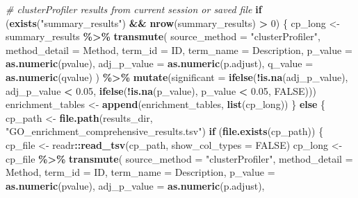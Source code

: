 \documentclass[
]{article}
\newenvironment{Shaded}{\begin{snugshade}}{\end{snugshade}}
\newcommand{\AttributeTok}[1]{\textcolor[rgb]{0.13,0.29,0.53}{#1}}
\newcommand{\CommentTok}[1]{\textcolor[rgb]{0.56,0.35,0.01}{\textit{#1}}}
\newcommand{\ConstantTok}[1]{\textcolor[rgb]{0.56,0.35,0.01}{#1}}
\newcommand{\ControlFlowTok}[1]{\textcolor[rgb]{0.13,0.29,0.53}{\textbf{#1}}}
\newcommand{\DecValTok}[1]{\textcolor[rgb]{0.00,0.00,0.81}{#1}}
\newcommand{\FloatTok}[1]{\textcolor[rgb]{0.00,0.00,0.81}{#1}}
\newcommand{\FunctionTok}[1]{\textcolor[rgb]{0.13,0.29,0.53}{\textbf{#1}}}
\newcommand{\NormalTok}[1]{#1}
\newcommand{\OtherTok}[1]{\textcolor[rgb]{0.56,0.35,0.01}{#1}}
\newcommand{\SpecialCharTok}[1]{\textcolor[rgb]{0.81,0.36,0.00}{\textbf{#1}}}
\newcommand{\StringTok}[1]{\textcolor[rgb]{0.31,0.60,0.02}{#1}}
\begin{document}
\begin{Shaded}
\begin{Highlighting}[]
\CommentTok{\# clusterProfiler results from current session or saved file}
\ControlFlowTok{if}\NormalTok{ (}\FunctionTok{exists}\NormalTok{(}\StringTok{"summary\_results"}\NormalTok{) }\SpecialCharTok{\&\&} \FunctionTok{nrow}\NormalTok{(summary\_results) }\SpecialCharTok{\textgreater{}} \DecValTok{0}\NormalTok{) \{}
\NormalTok{  cp\_long }\OtherTok{\textless{}{-}}\NormalTok{ summary\_results }\SpecialCharTok{\%\textgreater{}\%}
    \FunctionTok{transmute}\NormalTok{(}
      \AttributeTok{source\_method =} \StringTok{"clusterProfiler"}\NormalTok{,}
      \AttributeTok{method\_detail =}\NormalTok{ Method,}
      \AttributeTok{term\_id =}\NormalTok{ ID,}
      \AttributeTok{term\_name =}\NormalTok{ Description,}
      \AttributeTok{p\_value =} \FunctionTok{as.numeric}\NormalTok{(pvalue),}
      \AttributeTok{adj\_p\_value =} \FunctionTok{as.numeric}\NormalTok{(p.adjust),}
      \AttributeTok{q\_value =} \FunctionTok{as.numeric}\NormalTok{(qvalue)}
\NormalTok{    ) }\SpecialCharTok{\%\textgreater{}\%}
    \FunctionTok{mutate}\NormalTok{(}\AttributeTok{significant =} \FunctionTok{ifelse}\NormalTok{(}\SpecialCharTok{!}\FunctionTok{is.na}\NormalTok{(adj\_p\_value), adj\_p\_value }\SpecialCharTok{\textless{}} \FloatTok{0.05}\NormalTok{, }\FunctionTok{ifelse}\NormalTok{(}\SpecialCharTok{!}\FunctionTok{is.na}\NormalTok{(p\_value), p\_value }\SpecialCharTok{\textless{}} \FloatTok{0.05}\NormalTok{, }\ConstantTok{FALSE}\NormalTok{)))}
\NormalTok{  enrichment\_tables }\OtherTok{\textless{}{-}} \FunctionTok{append}\NormalTok{(enrichment\_tables, }\FunctionTok{list}\NormalTok{(cp\_long))}
\NormalTok{\} }\ControlFlowTok{else}\NormalTok{ \{}
\NormalTok{  cp\_path }\OtherTok{\textless{}{-}} \FunctionTok{file.path}\NormalTok{(results\_dir, }\StringTok{"GO\_enrichment\_comprehensive\_results.tsv"}\NormalTok{)}
  \ControlFlowTok{if}\NormalTok{ (}\FunctionTok{file.exists}\NormalTok{(cp\_path)) \{}
\NormalTok{    cp\_file }\OtherTok{\textless{}{-}}\NormalTok{ readr}\SpecialCharTok{::}\FunctionTok{read\_tsv}\NormalTok{(cp\_path, }\AttributeTok{show\_col\_types =} \ConstantTok{FALSE}\NormalTok{)}
\NormalTok{    cp\_long }\OtherTok{\textless{}{-}}\NormalTok{ cp\_file }\SpecialCharTok{\%\textgreater{}\%}
      \FunctionTok{transmute}\NormalTok{(}
        \AttributeTok{source\_method =} \StringTok{"clusterProfiler"}\NormalTok{,}
        \AttributeTok{method\_detail =}\NormalTok{ Method,}
        \AttributeTok{term\_id =}\NormalTok{ ID,}
        \AttributeTok{term\_name =}\NormalTok{ Description,}
        \AttributeTok{p\_value =} \FunctionTok{as.numeric}\NormalTok{(pvalue),}
        \AttributeTok{adj\_p\_value =} \FunctionTok{as.numeric}\NormalTok{(p.adjust),}

\end{Highlighting}
\end{Shaded}
\end{document}
